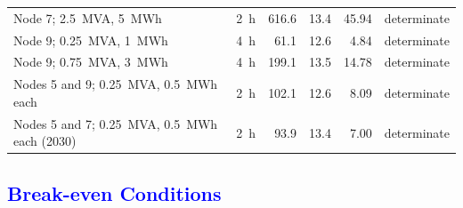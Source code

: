 \begin{table}[htbp!]
\begin{tabular}{l c r r r l}
        Node 7; 2.5~MVA, 5~MWh               & 2~h & 616.6 & 13.4 & 45.94 & determinate \\
        Node 9; 0.25~MVA, 1~MWh              & 4~h & 61.1  & 12.6 & 4.84  & determinate \\
        Node 9; 0.75~MVA, 3~MWh              & 4~h & 199.1 & 13.5 & 14.78 & determinate \\
        Nodes 5 and 9; 0.25~MVA, 0.5~MWh each        & 2~h & 102.1 & 12.6 & 8.09 & determinate \\
        Nodes 5 and 7; 0.25~MVA, 0.5~MWh each (2030) & 2~h & 93.9  & 13.4 & 7.00 & determinate \\
        \bottomrule
    \end{tabular}
\end{table}

\subsection{\textcolor{blue}{Break-even Conditions}}
\label{subsec:res_breakeven}

